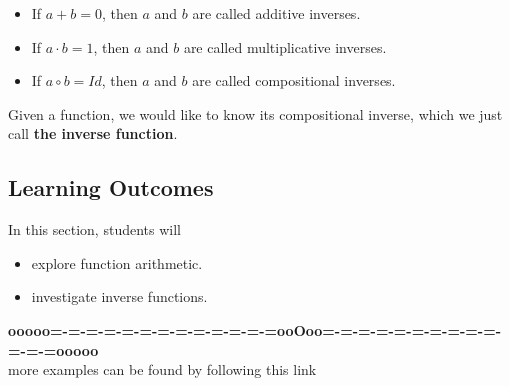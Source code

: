 \documentclass{ximera}
\begin{document}
\begin{itemize}
\item If $a + b = 0$, then $a$ and $b$ are called additive inverses.
\item If $a \cdot b = 1$, then $a$ and $b$ are called multiplicative inverses.
\item If $a \circ b = Id$, then $a$ and $b$ are called compositional inverses.
\end{itemize}


Given a function, we would like to know its compositional inverse, which we just call \textbf{the inverse function}.







\subsection{Learning Outcomes}


\begin{sectionOutcomes}
In this section, students will 

\begin{itemize}
\item explore function arithmetic.
\item investigate inverse functions.
\end{itemize}
\end{sectionOutcomes}













\begin{center}
\textbf{\textcolor{green!50!black}{ooooo=-=-=-=-=-=-=-=-=-=-=-=-=ooOoo=-=-=-=-=-=-=-=-=-=-=-=-=ooooo}} \\

more examples can be found by following this link\\ 

\end{center}
\end{document}
